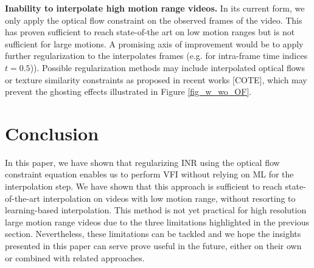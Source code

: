 \documentclass{article}
\begin{document}
\textbf{Inability to interpolate high motion range videos.}
In its current form, we only apply the optical flow constraint on the observed frames of the video.
This has proven sufficient to reach state-of-the art on low motion ranges but is not sufficient for large motions.
A promising axis of improvement would be to apply further regularization to the interpolates frames (e.g. for intra-frame time indices $t=0.5$)).
Possible regularization methods may include interpolated optical flows or texture similarity constraints as proposed in recent works [COTE],
which may prevent the ghosting effects illustrated in Figure \ref{fig_w_wo_OF}.


\section{Conclusion}

In this paper, we have shown that regularizing INR using the optical flow constraint equation
enables us to perform VFI without relying on ML for the interpolation step.
We have shown that this approach is sufficient to reach state-of-the-art interpolation on videos with low motion range,
without resorting to learning-based interpolation.
This method is not yet practical for high resolution large motion range videos due to the three limitations highlighted in the previous section.
Nevertheless, these limitations can be tackled and we hope the insights presented in this paper can serve prove useful in the future,
either on their own or combined with related approaches.



\end{document}
